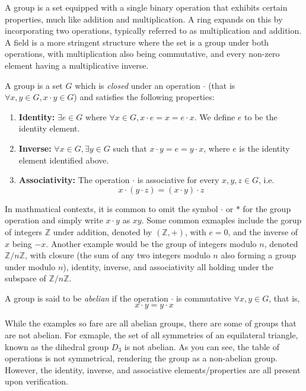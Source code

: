 \documentclass[12pt]{article}
\begin{document}
A group is a set equipped with a single binary operation that exhibits certain properties, much like addition and multiplication. A ring expands on this by incorporating two operations, typically referred to as multiplication and addition. A field is a more stringent structure where the set is a group under both operations, with multiplication also being commutative, and every non-zero element having a multiplicative inverse. 

\begin{definition}
    A group is a set $G$ which is \textit{closed} under an operation $\cdot$ (that is $\forall x, y \in G, x \cdot y \in G$) and satisfies the following properties:

    \begin{enumerate}
        \item \textbf{Identity:} $\exists e \in G$ where $\forall x \in G, x \cdot e = x = e \cdot x$. We define $e$ to be the identity element.
        \item \textbf{Inverse:} $\forall x \in G, \exists y \in G$ such that $x \cdot y = e = y \cdot x$, where $e$ is the identity element identified above. 
        \item \textbf{Associativity:} The operation $\cdot$ is associative for every $x, y, z \in G$, i.e. $$x\cdot(y\cdot z) = (x \cdot y)\cdot z$$
    \end{enumerate}
\end{definition}

In mathmatical contexts, it is common to omit the symbol $\cdot$ or $*$ for the group operation and simply write $x \cdot y$ as $xy$. Some common exmaples include the gorup of integers $\mathbb{Z}$ under addition, denoted by $(\mathbb{Z}, +)$, with $e = 0$, and the inverse of $x$ being $-x$. Another example would be the group of integers modulo $n$, denoted $\mathbb{Z}/n\mathbb{Z}$, with closure (the sum of any two integers modulo $n$ also forming a group under modulo $n$), identity, inverse, and associativity all holding under the subspace of $\mathbb{Z}/n\mathbb{Z}$.

\begin{definition}
   A group is said to be \textit{abelian} if the operation $\cdot$ is commutative $\forall x, y \in G$, that is, $$x \cdot y = y \cdot x$$ 
\end{definition}


While the examples so fare are all abelian groups, there are some of groups that are not abelian. For exmaple, the set of all symmetries of an equilateral triangle, known as the dihedral group $D_3$ is not abelian. As you can see, the table of operations is not symmetrical, rendering the group as a non-abelian group. However, the identity, inverse, and associative elements/properties are all present upon verification. 
\end{document}
